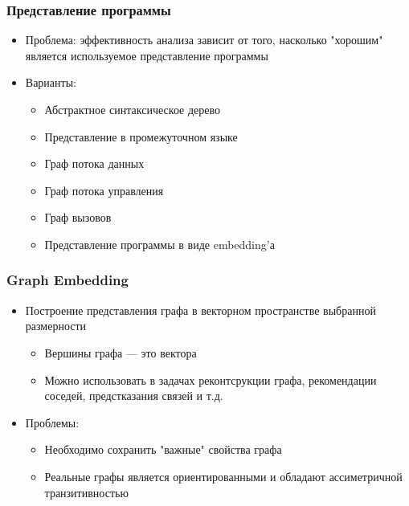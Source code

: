 \documentclass[xcolor=table,english]{beamer}
\begin{document}
\begin{frame}[fragile] \frametitle{Представление программы}
    \begin{itemize}
        \item Проблема: эффективность анализа зависит от того, насколько "хорошим" является используемое представление программы
        \item Варианты: 
        {
            \begin{itemize}
                \item Абстрактное синтаксическое дерево
                \item Представление в промежуточном языке
                \item Граф потока данных
                \item Граф потока управления
                \item Граф вызовов
                \item Представление программы в виде embedding'а
            \end{itemize}
        }
    \end{itemize}
\end{frame}

\begin{frame}[fragile] \frametitle{Graph Embedding}
    \begin{itemize}
        \item Построение представления графа в векторном пространстве выбранной размерности
        {
            \begin{itemize}
                \item Вершины графа --- это вектора
                \item Можно использовать в задачах реконтсрукции графа, рекомендации соседей, предстказания связей и т.д.
            \end{itemize} 
        }
        \item Проблемы:
        {
            \begin{itemize}
                \item Необходимо сохранить "важные" свойства графа
                \item Реальные графы является ориентированными и обладают ассиметричной транзитивностью
            \end{itemize}
        }
    \end{itemize}
\end{frame}
\end{document}
